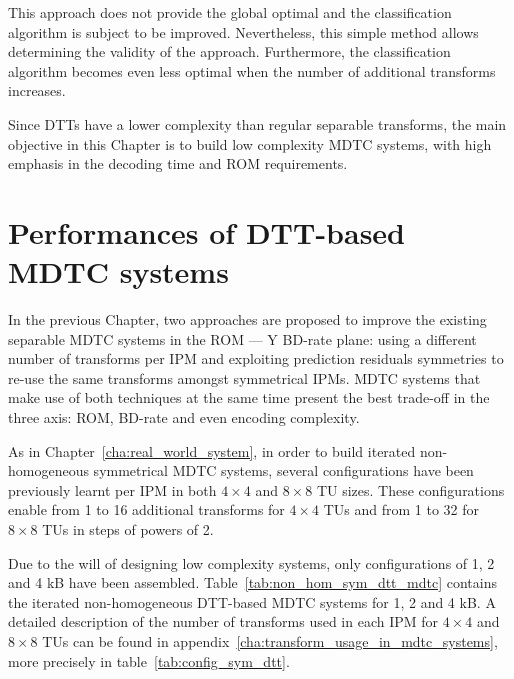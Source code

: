 \documentclass[11pt,a4paper,openright,twoside]{book}
\numberwithin{equation}{section} %
\numberwithin{figure}{section} %
\numberwithin{table}{section} %
\begin{document}
This approach does not provide the global optimal and the classification
algorithm is subject to be improved.
Nevertheless, this simple method allows determining the validity of the
approach.
Furthermore, the classification algorithm becomes even less optimal when the
number of additional transforms increases.

Since \acp{DTT} have a lower complexity than regular separable transforms, the
main objective in this Chapter is to build low complexity \ac{MDTC} systems,
with high emphasis in the decoding time and \acs{ROM} requirements.

\section{Performances of \acs{DTT}-based \acs{MDTC} systems}
\label{sec:performances_dtt_based_mdtc_systems}

In the previous Chapter, two approaches are proposed to improve the existing
separable \ac{MDTC} systems in the \acs{ROM} --- Y \ac{BD}-rate plane:
using a different number of transforms per \ac{IPM} and exploiting prediction
residuals symmetries to re-use the same transforms amongst symmetrical
\acp{IPM}.
\ac{MDTC} systems that make use of both techniques at the same time present
the best trade-off in the three axis: \acs{ROM}, \ac{BD}-rate and even
encoding complexity.

As in Chapter~\ref{cha:real_world_system}, in order to build iterated
non-homogeneous symmetrical \ac{MDTC} systems, several configurations have
been previously learnt per \ac{IPM} in both $4\times4$ and $8\times8$ \ac{TU}
sizes.
These configurations enable from 1 to 16 additional transforms for $4\times4$
\acp{TU} and from 1 to 32 for $8\times8$ \acp{TU} in steps of powers of 2.

Due to the will of designing low complexity systems, only configurations of 1,
2 and 4 kB have been assembled.
Table~\ref{tab:non_hom_sym_dtt_mdtc} contains the iterated non-homogeneous
DTT-based \acs{MDTC} systems for 1, 2 and 4 kB.
A detailed description of the number of transforms used in each \ac{IPM} for
$4\times4$ and $8\times8$ \acp{TU} can be found in
appendix~\ref{cha:transform_usage_in_mdtc_systems}, more precisely in
table~\ref{tab:config_sym_dtt}.
\end{document}
